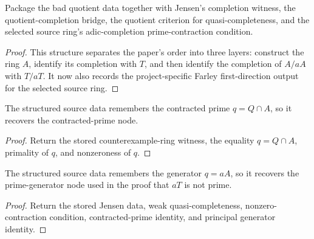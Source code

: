 \begin{definition}
  \label{def:bad_quotient_structured_source}
  Package the bad quotient data together with Jensen's completion witness, the
  quotient-completion bridge, the quotient criterion for quasi-completeness,
  and the selected source ring's adic-completion prime-contraction condition.
\end{definition}

\begin{proof}
  This structure separates the paper's order into three layers: construct the
  ring \(A\), identify its completion with \(T\), and then identify the
  completion of \(A/aA\) with \(T/aT\).  It now also records the
  project-specific Farley first-direction output for the selected source ring.
\end{proof}

\begin{lemma}
  \label{lem:source_data_to_contracted_prime}
  The structured source data remembers the contracted prime
  \(q=Q\cap A\), so it recovers the contracted-prime node.
\end{lemma}

\begin{proof}
  Return the stored counterexample-ring witness, the equality
  \(q=Q\cap A\), primality of \(q\), and nonzeroness of \(q\).
\end{proof}

\begin{lemma}
  \label{lem:source_data_to_prime_generator}
  The structured source data remembers the generator \(q=aA\), so it recovers
  the prime-generator node used in the proof that \(aT\) is not prime.
\end{lemma}

\begin{proof}
  Return the stored Jensen data, weak quasi-completeness, nonzero-contraction
  condition, contracted-prime identity, and principal generator identity.
\end{proof}

